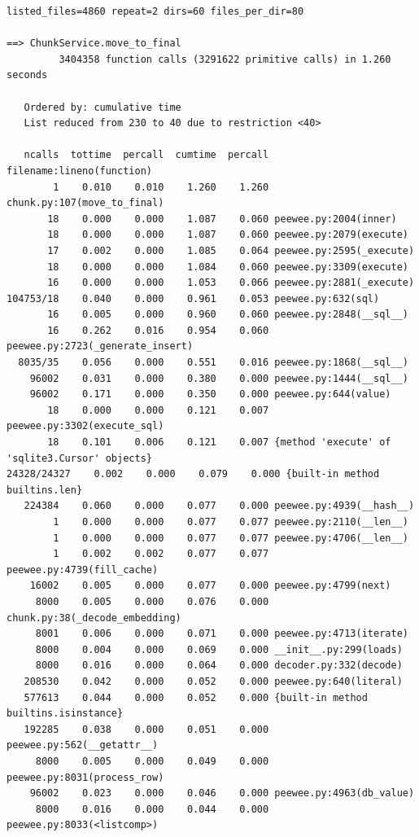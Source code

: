 \documentclass[a4paper,12pt]{article}
\begin{document}
\begin{lstlisting}[basicstyle=\ttfamily\fontsize{9}{9}\selectfont]
listed_files=4860 repeat=2 dirs=60 files_per_dir=80

==> ChunkService.move_to_final
         3404358 function calls (3291622 primitive calls) in 1.260 seconds

   Ordered by: cumulative time
   List reduced from 230 to 40 due to restriction <40>

   ncalls  tottime  percall  cumtime  percall filename:lineno(function)
        1    0.010    0.010    1.260    1.260 chunk.py:107(move_to_final)
       18    0.000    0.000    1.087    0.060 peewee.py:2004(inner)
       18    0.000    0.000    1.087    0.060 peewee.py:2079(execute)
       17    0.002    0.000    1.085    0.064 peewee.py:2595(_execute)
       18    0.000    0.000    1.084    0.060 peewee.py:3309(execute)
       16    0.000    0.000    1.053    0.066 peewee.py:2881(_execute)
104753/18    0.040    0.000    0.961    0.053 peewee.py:632(sql)
       16    0.005    0.000    0.960    0.060 peewee.py:2848(__sql__)
       16    0.262    0.016    0.954    0.060 peewee.py:2723(_generate_insert)
  8035/35    0.056    0.000    0.551    0.016 peewee.py:1868(__sql__)
    96002    0.031    0.000    0.380    0.000 peewee.py:1444(__sql__)
    96002    0.171    0.000    0.350    0.000 peewee.py:644(value)
       18    0.000    0.000    0.121    0.007 peewee.py:3302(execute_sql)
       18    0.101    0.006    0.121    0.007 {method 'execute' of 'sqlite3.Cursor' objects}
24328/24327    0.002    0.000    0.079    0.000 {built-in method builtins.len}
   224384    0.060    0.000    0.077    0.000 peewee.py:4939(__hash__)
        1    0.000    0.000    0.077    0.077 peewee.py:2110(__len__)
        1    0.000    0.000    0.077    0.077 peewee.py:4706(__len__)
        1    0.002    0.002    0.077    0.077 peewee.py:4739(fill_cache)
    16002    0.005    0.000    0.077    0.000 peewee.py:4799(next)
     8000    0.005    0.000    0.076    0.000 chunk.py:38(_decode_embedding)
     8001    0.006    0.000    0.071    0.000 peewee.py:4713(iterate)
     8000    0.004    0.000    0.069    0.000 __init__.py:299(loads)
     8000    0.016    0.000    0.064    0.000 decoder.py:332(decode)
   208530    0.042    0.000    0.052    0.000 peewee.py:640(literal)
   577613    0.044    0.000    0.052    0.000 {built-in method builtins.isinstance}
   192285    0.038    0.000    0.051    0.000 peewee.py:562(__getattr__)
     8000    0.005    0.000    0.049    0.000 peewee.py:8031(process_row)
    96002    0.023    0.000    0.046    0.000 peewee.py:4963(db_value)
     8000    0.016    0.000    0.044    0.000 peewee.py:8033(<listcomp>)

\end{lstlisting}
\end{document}
